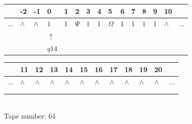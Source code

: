 \documentclass[11pt]{article}
\begin{document}
\begin{table}[H]
\centering
\begin{tabular}{lllllllllllllll}
 & -2 & -1 & 0 & 1 & 2 & 3 & 4 & 5 & 6 & 7 & 8 & 9 & 10 & \\
\hline
$...$ & \multicolumn{1}{|l|}{$\wedge$} & \multicolumn{1}{|l|}{$\wedge$} & \multicolumn{1}{|l|}{$1$} & \multicolumn{1}{|l|}{$1$} & \multicolumn{1}{|l|}{$\Psi$} & \multicolumn{1}{|l|}{$1$} & \multicolumn{1}{|l|}{$1$} & \multicolumn{1}{|l|}{$\Omega$} & \multicolumn{1}{|l|}{$1$} & \multicolumn{1}{|l|}{$1$} & \multicolumn{1}{|l|}{$1$} & \multicolumn{1}{|l|}{$1$} & \multicolumn{1}{|l|}{$\wedge$} & $...$\\
\hline
&  &  & $\uparrow$ &  &  &  &  &  &  &  &  &  &  &  \\
&  &  & $ q14 $ &  &  &  &  &  &  &  &  &  &  &  \\
\end{tabular}
\begin{tabular}{llllllllllll}
 & 11 & 12 & 13 & 14 & 15 & 16 & 17 & 18 & 19 & 20 & \\
\hline
$...$ & \multicolumn{1}{|l|}{$\wedge$} & \multicolumn{1}{|l|}{$\wedge$} & \multicolumn{1}{|l|}{$\wedge$} & \multicolumn{1}{|l|}{$\wedge$} & \multicolumn{1}{|l|}{$\wedge$} & \multicolumn{1}{|l|}{$\wedge$} & \multicolumn{1}{|l|}{$\wedge$} & \multicolumn{1}{|l|}{$\wedge$} & \multicolumn{1}{|l|}{$\wedge$} & \multicolumn{1}{|l|}{$\wedge$} & $...$\\
\hline
&  &  &  &  &  &  &  &  &  &  &  \\
&  &  &  &  &  &  &  &  &  &  &  \\
\end{tabular}
\\
Tape number: 64
\noindent\makebox[\linewidth]{\hdashrule{\textwidth}{1pt}{1pt}}\end{table}

\end{document}
